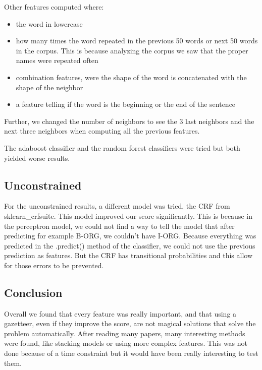 \documentclass{article}
\begin{document}
Other features computed where:
\begin{itemize}
\item the word in lowercase 
\item how many times the word repeated in the previous 50 words or next 50 words in the corpus. This is because analyzing the corpus we saw that the proper names were repeated often
\item combination features, were the shape of the word is concatenated with the shape of the neighbor
\item a feature telling if the word is the beginning or the end of the sentence
\end{itemize}

Further, we changed the number of neighbors to see the 3 last neighbors and the next three neighbors when computing all the previous features.

The adaboost classifier and the random forest classifiers were tried but both yielded worse results.

\subsection{Unconstrained}
For the unconstrained results, a different model was tried, the CRF from sklearn\_crfsuite. This model improved our score significantly. This is because in the perceptron model, we could not find a way to tell the model that after predicting for example B-ORG, we couldn't have I-ORG. Because everything was predicted in the .predict() method of the classifier, we could not use the previous prediction as features. But the CRF has transitional probabilities and this allow for those errors to be prevented.

\subsection{Conclusion}
Overall we found that every feature was really important, and that using a gazetteer, even if they improve the score, are not magical solutions that solve the problem automatically. After reading many papers, many interesting methods were found, like stacking models or using more complex features. This was not done because of a time constraint but it would have been really interesting to test them. 
\end{document}
